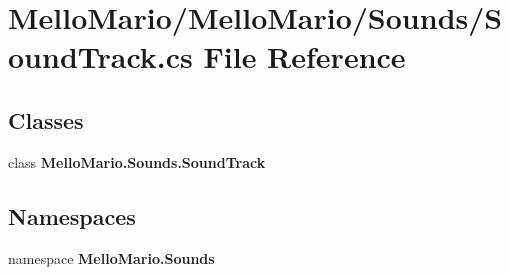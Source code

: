 \section{Mello\+Mario/\+Mello\+Mario/\+Sounds/\+Sound\+Track.cs File Reference}
\label{SoundTrack_8cs}
\subsection*{Classes}
\begin{DoxyCompactItemize}
\item 
class \textbf{ Mello\+Mario.\+Sounds.\+Sound\+Track}
\end{DoxyCompactItemize}
\subsection*{Namespaces}
\begin{DoxyCompactItemize}
\item 
namespace \textbf{ Mello\+Mario.\+Sounds}
\end{DoxyCompactItemize}
